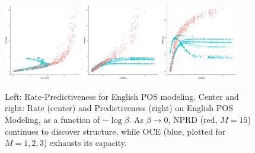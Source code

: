 \documentclass[11pt,letterpaper]{article}
\begin{document}
\begin{figure}
\includegraphics[width=0.3\textwidth]{cryptfig/english-info.pdf}
\includegraphics[width=0.3\textwidth]{cryptfig/english-nlogbeta-mem.pdf}
\includegraphics[width=0.3\textwidth]{cryptfig/english-nlogbeta-ee.pdf}
	\caption{Left: Rate-Predictiveness for English POS modeling. Center and right: Rate (center) and Predictiveness (right) on English POS Modeling, as a function of $-\log \beta$. As $\beta \rightarrow 0$, NPRD (red, $M=15$) continues to discover structure, while OCE (blue, plotted for $M=1,2,3$) exhausts its capacity.}\label{fig:eng-pos}
\end{figure}
\end{document}
